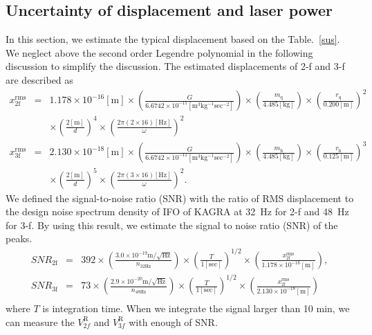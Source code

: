 \documentclass[A4]{spie}  %
\begin{document}
\subsection{Uncertainty of displacement and  laser power}
In this section, we estimate the typical displacement based on the Table.~\ref{sus}. We neglect above the second order Legendre polynomial in the following discussion to simplify the discussion. 
 The estimated displacements of 2-f and 3-f are described as
\begin{eqnarray}
x^{\mathrm{rms}}_{\mathrm{2f}}&=&1.178 \times 10^{-16}\mathrm{[m]} \times \left( \frac{G}{6.6742 \times 10^{-11} \mathrm{[m^3kg^{-1}sec^{-2}]}} \right) \times \left( \frac{m_{\mathrm{q}}}{4.485 \mathrm{[kg]}} \right) \times \left( \frac{r_{\mathrm{q}}}{0.200 \mathrm{[m]}} \right)^2 \nonumber \\
 &&\times \left( \frac{2\mathrm{[m]}}{d} \right)^4 \times \left( \frac{2\pi(2\times 16)\mathrm{[Hz]}}{\omega} \right)^2\\
x^{\mathrm{rms}}_{\mathrm{3f}}&=&2.130 \times 10^{-18}\mathrm{[m]} \times \left( \frac{G}{6.6742 \times 10^{-11} \mathrm{[m^3kg^{-1}sec^{-2}]}} \right) \times \left( \frac{m_{\mathrm{h}}}{4.485 \mathrm{[kg]}} \right) \times \left( \frac{r_{\mathrm{h}}}{0.125 \mathrm{[m]}} \right)^3 \nonumber \\
 &&\times \left( \frac{2\mathrm{[m]}}{d} \right)^5 \times \left( \frac{2\pi(3\times 16)\mathrm{[Hz]}}{\omega} \right)^2.
\end{eqnarray}
We defined the signal-to-noise ratio (SNR) with the ratio of RMS displacement to the design noise spectrum density of IFO of KAGRA at 32~Hz for 2-f and 48~Hz for 3-f.
By using this result, we estimate the signal to noise ratio (SNR) of the peaks.
\begin{eqnarray}
\!S\!N\!R_{\mathrm{2f}}&=&392 \times \left(\frac{3.0 \times 10^{-19} \mathrm{m/\sqrt{Hz}}}{n_{\mathrm{32Hz}}} \right) \times \left(\frac{T}{1 [\mathrm{sec}]} \right)^{1/2} \times \left(\frac{x_{\mathrm{2f}}^{\mathrm{rms}}}{1.178 \times 10^{-16}\mathrm{[m]} }  \right),   \\
\!S\!N\!R_{\mathrm{3f}}&=&73 \times \left(\frac{2.9 \times 10^{-20} \mathrm{m/\sqrt{Hz}}}{n_{\mathrm{48Hz}}} \right) \times \left(\frac{T}{1 [\mathrm{sec}]} \right)^{1/2} \times \left(\frac{x_{\mathrm{2f}}^{\mathrm{rms}}}{2.130 \times 10^{-18}\mathrm{[m] }} \right)   \\
\end{eqnarray}
where $T$ is integration time. When we integrate the signal larger than 10 min, we can measure the $V^{\mathrm{R}}_{2f}$ and $V^{\mathrm{R}}_{3f}$ with enough of SNR.
\end{document}
